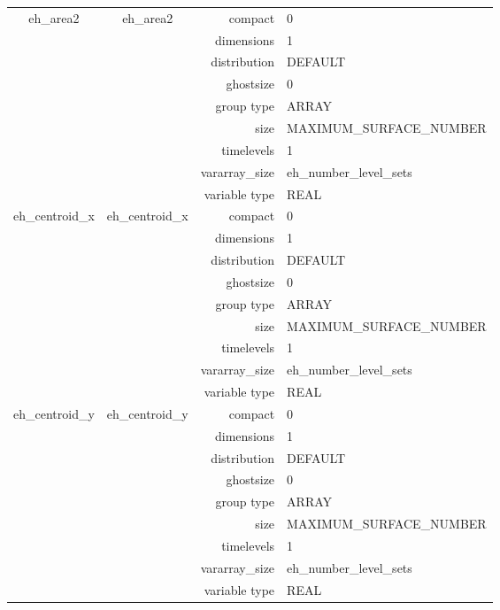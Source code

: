\begin{tabular*}{150mm}{|c|c@{\extracolsep{\fill}}|rl|}
\hline 
eh\_area2 & eh\_area2 & compact & 0 \\ 
 &  & dimensions & 1 \\ 
 &  & distribution & DEFAULT \\ 
 &  & ghostsize & 0 \\ 
 &  & group type & ARRAY \\ 
 &  & size & MAXIMUM\_SURFACE\_NUMBER \\ 
 &  & timelevels & 1 \\ 
 &  & vararray\_size & eh\_number\_level\_sets \\ 
 &  & variable type & REAL \\ 
\hline 
eh\_centroid\_x & eh\_centroid\_x & compact & 0 \\ 
 &  & dimensions & 1 \\ 
 &  & distribution & DEFAULT \\ 
 &  & ghostsize & 0 \\ 
 &  & group type & ARRAY \\ 
 &  & size & MAXIMUM\_SURFACE\_NUMBER \\ 
 &  & timelevels & 1 \\ 
 &  & vararray\_size & eh\_number\_level\_sets \\ 
 &  & variable type & REAL \\ 
\hline 
eh\_centroid\_y & eh\_centroid\_y & compact & 0 \\ 
 &  & dimensions & 1 \\ 
 &  & distribution & DEFAULT \\ 
 &  & ghostsize & 0 \\ 
 &  & group type & ARRAY \\ 
 &  & size & MAXIMUM\_SURFACE\_NUMBER \\ 
 &  & timelevels & 1 \\ 
 &  & vararray\_size & eh\_number\_level\_sets \\ 
 &  & variable type & REAL \\ 
\hline 
\end{tabular*} 



\vspace{5mm}
\vspace{5mm}

